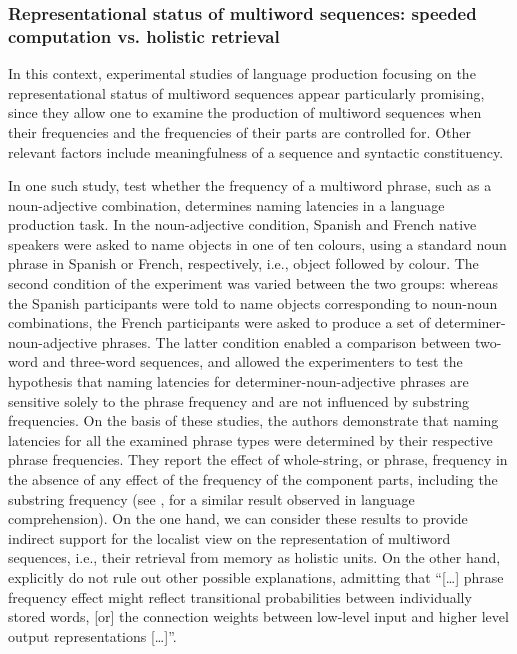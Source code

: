 \subsubsection{Representational status of multiword sequences: speeded computation vs. holistic retrieval}

In this context, experimental studies of language production focusing on the representational status of multiword sequences appear particularly promising, since they allow one to examine the production of multiword sequences when their frequencies and the frequencies of their parts are controlled for. Other relevant factors include meaningfulness of a sequence and syntactic constituency.

In one such study, \citet{janssen-barber} test whether the frequency of a multiword phrase, such as a noun-adjective combination, determines naming latencies in a language production task. In the noun-adjective condition, Spanish and French native speakers were asked to name objects in one of ten colours, using a standard noun phrase in Spanish or French, respectively, i.e., object followed by colour. The second condition of the experiment was varied between the two groups: whereas the Spanish participants were told to name objects corresponding to noun-noun combinations, the French participants were asked to produce a set of determiner-noun-adjective phrases. The latter condition enabled a comparison between two-word and three-word sequences, and allowed the experimenters to test the hypothesis that naming latencies for determiner-noun-adjective phrases are sensitive solely to the phrase frequency and are not influenced by substring frequencies. On the basis of these studies, the authors demonstrate that naming latencies for all the examined phrase types were determined by their respective phrase frequencies. They report the effect of whole-string, or phrase, frequency in the absence of any effect of the frequency of the component parts, including the substring frequency (see \citealt{tremblay-etal11}, for a similar result observed in language comprehension). On the one hand, we can consider these results to provide indirect support for the localist view on the representation of multiword sequences, i.e., their retrieval from memory as holistic units. On the other hand, \citet[][10]{janssen-barber} explicitly do not rule out other possible explanations, admitting that ``[\dots] phrase frequency effect might reflect transitional probabilities between individually stored words, [or] the connection weights between low-level input and higher level output representations [\dots]''.

